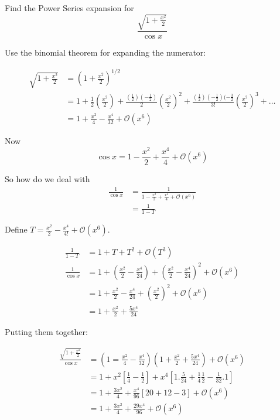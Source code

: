 \documentclass[10pt]{scrartcl}
\begin{document}
\begin{example}
Find the Power Series expansion for
\[\frac{\sqrt{1 + \frac{x^2}{2}}}{\cos x}\]	

Use the binomial theorem for expanding the numerator: 

\[
\begin{aligned}
  \sqrt{1 + \frac{x^2}{2}} &= \left(1 + \frac{x^2}{2}\right)^{1/2}\\
  &= 1 + \frac{1}{2}\left(\frac{x^2}{2}\right) + \frac{(\frac{1}{2})(-\frac{1}{2})}{2} \left(\frac{x^2}{2}\right)^2 +\frac{(\frac{1}{2})(-\frac{1}{2})(-\frac{3}{2}}{3!} \left(\frac{x^2}{2}\right)^3 + \dots \\
  &= 1 + \frac{x^2}{4} -\frac{x^4}{32} + \mathcal{O}(x^6)
\end{aligned}
\]

Now 
\[\cos x = 1 - \frac{x^2}{2} + \frac{x^4}{4} + \mathcal{O}(x^6)\]

So how do we deal with 
\[\begin{aligned}\frac{1}{\cos x} &= \frac{1}{1 - \frac{x^2}{2} + \frac{x^4}{4} + \mathcal{O}(x^6)}\\
&= \frac{1}{1-T}\end{aligned}\]

Define $T = \frac{x^2}{2} -\frac{x^4}{4!} + \mathcal{O}(x^6)$. 

\[
\begin{aligned}
  \frac{1}{1-T} &= 1 + T + T^2 + \mathcal{O}(T^3)\\
  \frac{1}{\cos x} &= 1 + \left(\frac{x^2}{2} - \frac{x^4}{24}\right) + \left(\frac{x^2}{2} - \frac{x^4}{24}\right)^2 + \mathcal{O}(x^6)\\
  &= 1 + \frac{x^2}{2} - \frac{x^4}{24} + \left(\frac{x^2}{2}\right)^2 + \mathcal{O}(x^6)\\
  &= 1 + \frac{x^2}{2} + \frac{5x^4}{24}
\end{aligned}
\]

Putting them together: 

\[
\begin{aligned}
  \frac{\sqrt{1 + \frac{x^2}{2}}}{\cos x} &= \left(1 = \frac{x^2}{4} - \frac{x^4}{32}\right)\left(1 + \frac{x^2}{2} + \frac{5x^4}{24}\right) + \mathcal{O}(x^6)\\
  &= 1 + x^2\left[ \frac{1}{4} - \frac{1}{2}\right] + x^4\left[1.\frac{5}{24} + \frac{1}{4}\frac{1}{2} - \frac{1}{32}.1\right]\\
  &= 1 + \frac{3x^2}{4} + \frac{x^4}{96}[ 20 + 12 - 3] + \mathcal{O}(x^6)\\
  &= 1 + \frac{3x^2}{4} + \frac{29x^4}{96} + \mathcal{O}(x^6)
\end{aligned}
\]
\end{example}\vspace*{5pt}
\end{document}
